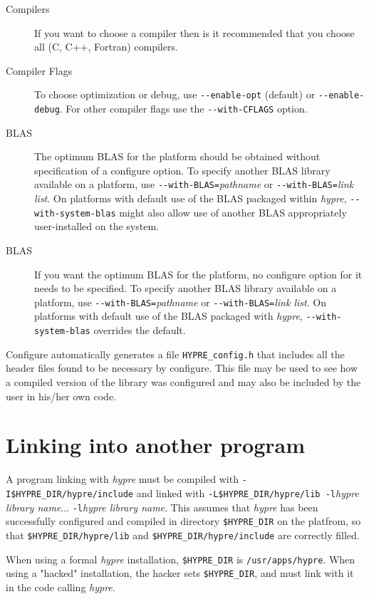 \begin{description}

\item[Compilers] If you want to choose a compiler then is it recommended
that you choose all (C, C++, Fortran) compilers.

\item[Compiler Flags] To choose optimization or debug, use
\verb+--enable-opt+ (default) or \verb+--enable-debug+.
For other compiler flags use the \verb+--with-CFLAGS+ option.  

\item[BLAS] The optimum BLAS for the platform should be obtained
without specification of a configure option.
To specify another BLAS library available on a
platform, use \verb+--with-BLAS=+{\itshape pathname} or
\verb+--with-BLAS=+{\itshape link list}.  On platforms with
default use of the BLAS packaged within {\slshape hypre},
\verb+--with-system-blas+ might also allow use
of another BLAS appropriately user-installed on the system.

\item[BLAS] If you want the optimum BLAS for the platform,
no configure option for it needs to be specified.
To specify another BLAS library available on a
platform, use \verb+--with-BLAS=+{\itshape pathname} or
\verb+--with-BLAS=+{\itshape link list}.  On platforms with
default use of the BLAS packaged with {\slshape hypre},
\verb+--with-system-blas+ overrides the default.

\end{description}

Configure automatically generates a file 
\verb+HYPRE_config.h+ that includes all the
header files found to be necessary by configure.  This file may be used
to see how a compiled version of the library was configured and may also
be included by the user in his/her own code.

\section{Linking into another program}

A program linking with {\slshape hypre} must be compiled with
\verb+-I$HYPRE_DIR/hypre/include+ and linked with
\verb+-L$HYPRE_DIR/hypre/lib -l+{\itshape hypre library name}... 
\verb+-l+{\itshape hypre library name}.
This assumes that {\slshape hypre} has been
successfully configured and compiled in directory \verb+$HYPRE_DIR+
on the platfrom, so that \verb+$HYPRE_DIR/hypre/lib+
and \verb+$HYPRE_DIR/hypre/include+ are correctly filled.

When using a formal {\slshape hypre} installation, \verb+$HYPRE_DIR+ is
\verb+/usr/apps/hypre+.
When using a "hacked" installation, the hacker sets \verb+$HYPRE_DIR+,
and must link with it in the code calling {\slshape hypre}. 
